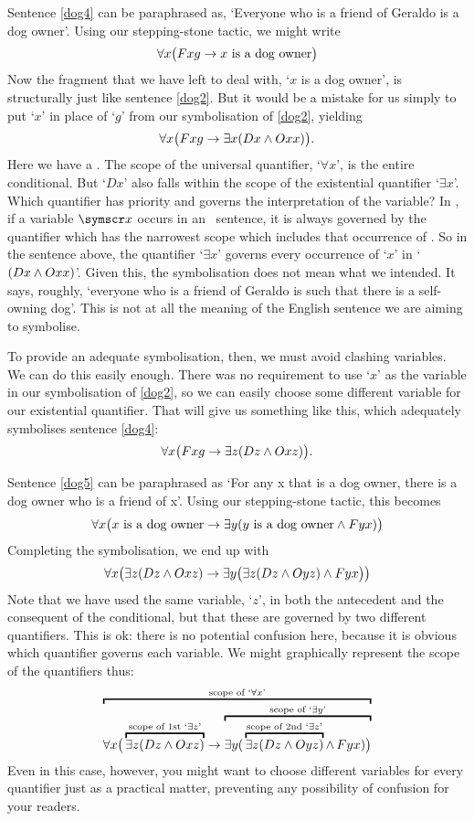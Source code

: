 Sentence \ref{dog4} can be paraphrased as, `Everyone who is a friend of Geraldo is a dog owner'. Using our stepping-stone tactic, we might write 
$$\forall x \bigl(Fxg \rightarrow x \text{ is a dog owner}\bigr)$$
Now the fragment that we have left to deal with, `$x$ is a dog owner', is structurally just like sentence \ref{dog2}. But it would be a mistake for us simply to put `$x$' in place of `$g$' from our symbolisation of \ref{dog2}, yielding
$$\forall x \bigl(Fxg \rightarrow \exists x(Dx \wedge Oxx) \bigr).$$
Here we have a . The scope of the universal quantifier, `$\forall x$', is the entire conditional. But `$Dx$' also falls within the scope of the existential quantifier `$\exists x$'. Which quantifier has priority and governs the interpretation of the variable? In \FOL, if a variable $\meta{x}$ occurs in an \FOL\ sentence, it is always governed by the quantifier which has the narrowest scope which includes that occurrence of . So in the sentence above, the quantifier `$\exists x$' governs every occurrence of `$x$' in `$(Dx \wedge Oxx)$'. Given this, the symbolisation does not mean what we intended. It says, roughly, `everyone who is a friend of Geraldo is such that there is a self-owning dog'. This is not at all the meaning of the English sentence we are aiming to symbolise.


To provide an adequate symbolisation, then, we must avoid clashing variables. We can do this easily enough. There was no requirement to use `$x$' as the variable in our symbolisation of \ref{dog2}, so we can easily choose some different variable for our existential quantifier. That will give us something like this, which adequately symbolises sentence \ref{dog4}:
$$\forall x\bigl(Fxg \rightarrow\exists z(Dz \wedge Oxz) \bigr).$$


Sentence \ref{dog5} can be paraphrased as `For any x that is a dog owner, there is a dog owner who is a friend of x'. Using our stepping-stone tactic, this becomes 
$$\forall x\bigl(\mbox{$x$ is a dog owner}\rightarrow\exists y(\mbox{$y$ is a dog owner}\wedge Fyx) \bigr)$$
Completing the symbolisation, we end up with
$$\forall x\bigl(\exists z(Dz \wedge Oxz)\rightarrow\exists y\bigl(\exists z(Dz \wedge Oyz)\wedge Fyx\bigr) \bigr)$$
Note that we have used the same variable, `$z$', in both the antecedent and the consequent of the conditional, but that these are governed by two different quantifiers. This is ok: there is no potential confusion here, because it is obvious which quantifier governs each variable. We might graphically represent the scope of the quantifiers thus:
$$\overbracket{\forall x\bigl(\,\overbracket{\exists z(Dz \eand Oxz)}^{\text{scope of 1st `}\exists z\text{'}}\eif \overbracket{\exists y(\,\overbracket{\exists z(Dz \eand Oyz)}^{\text{scope of 2nd `}\exists z\text{'}}\mathop{\eand} Fyx) \bigr)}^{\text{scope of `}\exists y\text{'}}}^{\text{scope of `}\forall x\text{'}}$$
Even in this case, however, you might want to choose different variables for every quantifier just as a practical matter, preventing any possibility of confusion for your readers.

